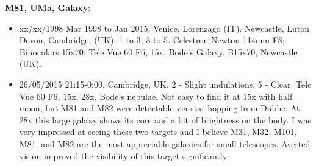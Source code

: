 {\bf M81, UMa, Galaxy}:
\begin{itemize}
\item xx/xx/1998 Mar 1998 to Jan 2015, Venice, Lorenzago (IT). Newcastle, Luton Devon, Cambridge, (UK). 1 to 3, 3 to 5. Celestron Newton 114mm F8; Binoculars 15x70; Tele Vue 60 F6, 15x. Bode's Galaxy. B15x70, Newcastle (UK).
\item 26/05/2015 21:15-0:00, Cambridge, UK. 2 - Slight undulations, 5 - Clear. Tele Vue 60 F6, 15x, 28x. Bode's nebulae. Not easy to find it at 15x with half moon, but M81 and M82 were detectable via star hopping from Dubhe. At 28x this large galaxy shows its core and a bit of brightness on the body. I was very impressed at seeing these two targets and I believe M31, M32, M101, M81, and M82 are the most appreciable galaxies for small telescopes. Averted vision improved the visibility of this target significantly.
\end{itemize}
